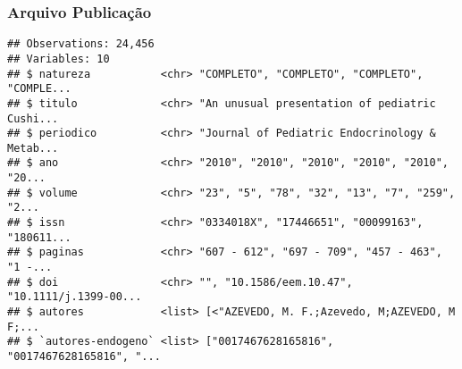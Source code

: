 \documentclass[]{article}
\newenvironment{Shaded}{\begin{snugshade}}{\end{snugshade}}
\newcommand{\KeywordTok}[1]{\textcolor[rgb]{0.13,0.29,0.53}{\textbf{#1}}}
\newcommand{\DecValTok}[1]{\textcolor[rgb]{0.00,0.00,0.81}{#1}}
\newcommand{\StringTok}[1]{\textcolor[rgb]{0.31,0.60,0.02}{#1}}
\newcommand{\CommentTok}[1]{\textcolor[rgb]{0.56,0.35,0.01}{\textit{#1}}}
\newcommand{\ControlFlowTok}[1]{\textcolor[rgb]{0.13,0.29,0.53}{\textbf{#1}}}
\newcommand{\OperatorTok}[1]{\textcolor[rgb]{0.81,0.36,0.00}{\textbf{#1}}}
\newcommand{\NormalTok}[1]{#1}
\begin{document}
\subsubsection{Arquivo Publicação}\label{arquivo-publicacao}

\begin{Shaded}
\end{Shaded}

\begin{verbatim}
## Observations: 24,456
## Variables: 10
## $ natureza           <chr> "COMPLETO", "COMPLETO", "COMPLETO", "COMPLE...
## $ titulo             <chr> "An unusual presentation of pediatric Cushi...
## $ periodico          <chr> "Journal of Pediatric Endocrinology & Metab...
## $ ano                <chr> "2010", "2010", "2010", "2010", "2010", "20...
## $ volume             <chr> "23", "5", "78", "32", "13", "7", "259", "2...
## $ issn               <chr> "0334018X", "17446651", "00099163", "180611...
## $ paginas            <chr> "607 - 612", "697 - 709", "457 - 463", "1 -...
## $ doi                <chr> "", "10.1586/eem.10.47", "10.1111/j.1399-00...
## $ autores            <list> [<"AZEVEDO, M. F.;Azevedo, M;AZEVEDO, M F;...
## $ `autores-endogeno` <list> ["0017467628165816", "0017467628165816", "...
\end{verbatim}
\end{document}
